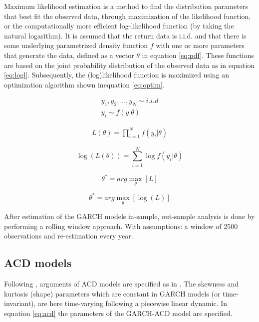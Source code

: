 \documentclass[a4paper, nobind]{templates/ociamthesis}
\begin{document}
\noindent Maximum likelihood estimation is a method to find the distribution parameters that best fit the observed data, through maximization of the likelihood function, or the computationally more efficient log-likelihood function (by taking the natural logarithm). It is assumed that the return data is i.i.d. and that there is some underlying parametrized density function \(f\) with one or more parameters that generate the data, defined as a vector \(\theta\) in equation \eqref{eq:pdf}. These functions are based on the joint probability distribution of the observed data as in equation \eqref{eq:logl}. Subsequently, the (log)likelihood function is maximized using an optimization algorithm shown inequation \eqref{eq:optim}.

\begin{align} 
  y_1,y_2,...,y_N \sim i.i.d
    \\
  y_i \sim f(y|\theta)
 \label{eq:pdf}
\end{align}

\begin{align} 
 L(\theta) = \prod^N_{i=1}f(y_i|\theta)
 \label{eq:logl}
\end{align}

\[\log(L(\theta)) = \sum^N_{i=1} \log f(y_i |\theta)\]

\begin{equation} 
\theta^{*} = arg \max_{\theta} [ L] 
 \label{eq:optim}
\end{equation}

\begin{equation} 
\theta^{*} = arg \max_{\theta} [\log(L)]
\end{equation}

\noindent After estimation of the GARCH models in-sample, out-sample analysis is done by performing a rolling window approach. With assumptions: a window of 2500 observations and re-estimation every year.

\hypertarget{acd-models-meth}{%
\subsection{ACD models}\label{acd-models-meth}}

\noindent Following \textcite{ghalanos2016}, arguments of ACD models are specified as in \textcite{hansen1994}. The skewness and kurtosis (shape) parameters which are constant in GARCH models (or time-invariant), are here time-varying following a piecewise linear dynamic. In equation \eqref{eq:acd} the parameters of the GARCH-ACD model are specified.
\end{document}
